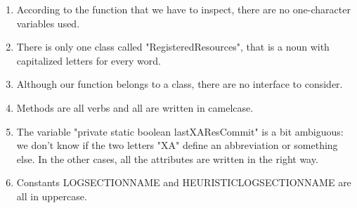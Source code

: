 \begin{enumerate}
	\item According to the function that we have to inspect, there are no one-character variables used.
	\item There is only one class called "RegisteredResources", that is a noun with capitalized letters for every word.
	\item Although our function belongs to a class, there are no interface to consider.
	\item Methods are all verbs and all are written in camelcase.
	\item The variable "private static boolean lastXAResCommit" is a bit ambiguous: we don't know if the two letters "XA" define an abbreviation or something else. In the other cases, all the attributes are written in the right way.
	\item Constants LOG\textunderscore SECTION\textunderscore NAME and HEURISTIC\textunderscore LOG\textunderscore SECTION\textunderscore NAME are all in uppercase.
\end{enumerate}
